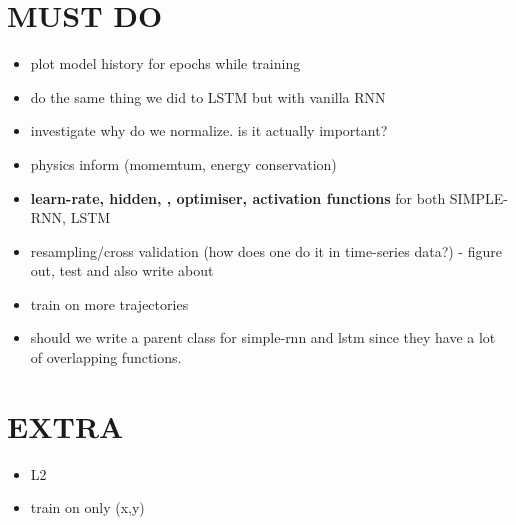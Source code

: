 \section{MUST DO}
\begin{itemize}
    \item plot model history for epochs while training
    \item do the same thing we did to LSTM but with vanilla RNN 
    \item investigate why do we normalize. is it actually important? 
    \item physics inform (momemtum, energy conservation)
    \item \textbf{learn-rate, hidden, , optimiser, activation functions} for both SIMPLE-RNN, LSTM
    \item resampling/cross validation (how does one do it in time-series data?) - figure out, test and also write about 
    \item train on more trajectories
    \item should we write a parent class for simple-rnn and lstm since they have a lot of overlapping functions.
\end{itemize}


\section{EXTRA}
\begin{itemize}
    \item L2
    \item train on only (x,y) 
\end{itemize}